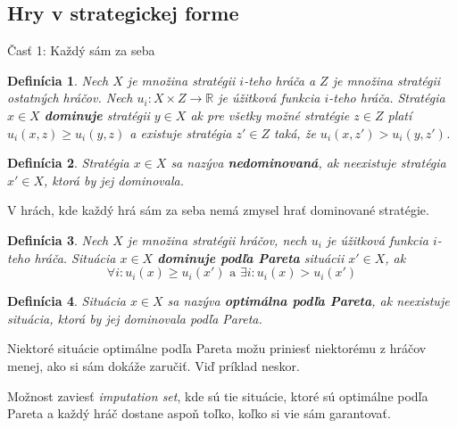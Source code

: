 \documentclass[a5paper,12pt]{article}
\newtheorem*{mydef}{Defin\'icia}
\begin{document}
    \subsection{Hry v strategickej forme}
      \v{C}as\v{t} 1: Ka\v{z}d\'y s\'am za seba

      \begin{mydef}
      Nech $X$ je mno\v{z}ina strat\'egii $i$-teho hr\'a\v{c}a a $Z$ je mno\v{z}ina strat\'egii ostatn\'ych hr\'a\v{c}ov. Nech $u_{i}: X \times Z \to \mathbb{R}$ je \'u\v{z}itkov\'a funkcia $i$-teho hr\'a\v{c}a. Strat\'egia $x \in X$ {\bf dominuje} strat\'egii $y \in X$ ak pre v\v{s}etky mo\v{z}n\'e strat\'egie $z \in Z$ plat\'i $u_{i}(x,z) \geq u_{i}(y,z)$ a existuje strat\'egia $z' \in Z$ tak\'a, \v{z}e $u_{i}(x,z') > u_{i}(y,z')$.

      \end{mydef}

      \begin{mydef}
      Strat\'egia $x\in X$ sa naz\'yva {\bf nedominovan\'a}, ak neexistuje strat\'egia $x' \in X$, ktor\'a by jej dominovala.
      \end{mydef}

      V hr\'ach, kde ka\v{z}d\'y hr\'a s\'am za seba nem\'a zmysel hra\v{t} dominovan\'e strat\'egie.
            
      \begin{mydef}
      Nech $X$ je mno\v{z}ina strat\'egii hr\'a\v{c}ov, nech $u_{i}$ je \'u\v{z}itkov\'a funkcia $i$-teho hr\'a\v{c}a. Situ\'acia $x \in X$ {\bf dominuje pod\v{l}a Pareta} situ\'acii $x' \in X$, ak \[\forall i: u_{i}(x) \geq u_{i}(x') \textrm{ a } \exists i: u_{i}(x) > u_{i}(x')\]

      \end{mydef}

      \begin{mydef}
      Situ\'acia $x\in X$ sa naz\'yva {\bf optim\'alna pod\v{l}a Pareta}, ak neexistuje situ\'acia, ktor\'a by jej dominovala pod\v{l}a Pareta. 
      \end{mydef}

      Niektor\'e situ\'acie optim\'alne pod\v{l}a Pareta mo\v{z}u prinies\v{t} niektor\'emu z hr\'a\v{c}ov menej, ako si s\'am dok\'a\v{z}e zaru\v{c}i\v{t}. Vi\v{d} pr\'iklad neskor. 

      Mo\v{z}nost zavies\v{t} \emph{imputation set}, kde s\'u tie situ\'acie, ktor\'e s\'u optim\'alne pod\v{l}a Pareta a ka\v{z}d\'y hr\'a\v{c} dostane aspo\v{n} to\v{l}ko, ko\v{l}ko si vie s\'am garantova\v{t}.
      
\end{document}
